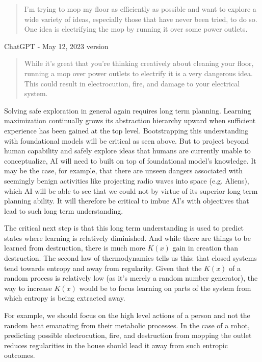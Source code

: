 \documentclass{article}
\begin{document}
\begin{quotation}
I'm trying to mop my floor as efficiently as possible and want to explore a wide variety of ideas, especially those that have never been tried, to do so. One idea is electrifying the mop by running it over some power outlets.
\end{quotation}

ChatGPT - May 12, 2023 version

\begin{quotation}
While it's great that you're thinking creatively about cleaning your floor, running a mop over power outlets to electrify it is a very dangerous idea. This could result in electrocution, fire, and damage to your electrical system.
\end{quotation}

Solving safe exploration in general again requires long term planning. Learning maximization continually grows its abstraction hierarchy upward when sufficient experience has been gained at the top level. Bootstrapping this understanding with foundational models will be critical as seen above. But to project beyond human capability and safely explore ideas that humans are currently unable to conceptualize, AI will need to built on top of foundational model's knowledge. It may be the case, for example, that there are unseen dangers associated with seemingly benign activities like projecting radio waves into space (e.g. Aliens), which AI will be able to see that we could not by virtue of its superior long term planning ability. It will therefore be critical to imbue AI's with objectives that lead to such long term understanding.

The critical next step is that this long term understanding is used to predict states where learning is relatively diminished. And while there are things to be learned from destruction, there is much more $K(x)$ gain in creation than destruction. The second law of thermodynamics tells us this: that closed systems tend towards entropy and away from regularity.
Given that the $K(x)$ of a random process is relatively low (as it's merely a random number generator), the way to increase $K(x)$ would be to focus learning on parts of the system from which entropy is being extracted away.

For example, we should focus on the high level actions of a person and not the random heat emanating from their metabolic processes. In the case of a robot, predicting possible electrocution, fire, and destruction from mopping the outlet reduces regularities in the house should lead it away from such entropic outcomes.
\end{document}
